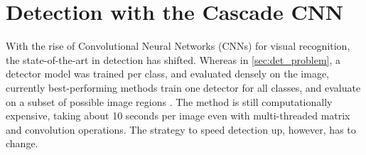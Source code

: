 \chapter{Detection with the Cascade CNN}\label{sec:ccnn_chapter}

With the rise of Convolutional Neural Networks (CNNs) for visual recognition, the state-of-the-art in detection has shifted.
Whereas in \autoref{sec:det_problem}, a detector model was trained per class, and evaluated densely on the image, currently best-performing methods train one detector for all classes, and evaluate on a subset of possible image regions \parencite{Girshick-CVPR-2014}.
The method is still computationally expensive, taking about 10 seconds per image even with multi-threaded matrix and convolution operations.
The strategy to speed detection up, however, has to change.




